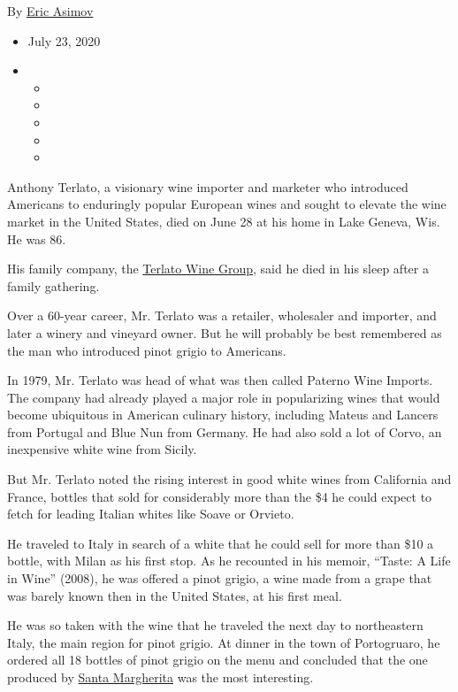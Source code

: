 By \href{https://www.nytimes3xbfgragh.onion/by/eric-asimov}{Eric Asimov}

\begin{itemize}
\item
  July 23, 2020
\item
  \begin{itemize}
  \item
  \item
  \item
  \item
  \item
  \end{itemize}
\end{itemize}

Anthony Terlato, a visionary wine importer and marketer who introduced
Americans to enduringly popular European wines and sought to elevate the
wine market in the United States, died on June 28 at his home in Lake
Geneva, Wis. He was 86.

His family company, the \href{http://www.twg.com/}{Terlato Wine Group},
said he died in his sleep after a family gathering.

Over a 60-year career, Mr. Terlato was a retailer, wholesaler and
importer, and later a winery and vineyard owner. But he will probably be
best remembered as the man who introduced pinot grigio to Americans.

In 1979, Mr. Terlato was head of what was then called Paterno Wine
Imports. The company had already played a major role in popularizing
wines that would become ubiquitous in American culinary history,
including Mateus and Lancers from Portugal and Blue Nun from Germany. He
had also sold a lot of Corvo, an inexpensive white wine from Sicily.

But Mr. Terlato noted the rising interest in good white wines from
California and France, bottles that sold for considerably more than the
\$4 he could expect to fetch for leading Italian whites like Soave or
Orvieto.

He traveled to Italy in search of a white that he could sell for more
than \$10 a bottle, with Milan as his first stop. As he recounted in his
memoir, ``Taste: A Life in Wine'' (2008), he was offered a pinot grigio,
a wine made from a grape that was barely known then in the United
States, at his first meal.

He was so taken with the wine that he traveled the next day to
northeastern Italy, the main region for pinot grigio. At dinner in the
town of Portogruaro, he ordered all 18 bottles of pinot grigio on the
menu and concluded that the one produced by
\href{https://santamargheritawines.com/our-wines/pinot-grigio/}{Santa
Margherita} was the most interesting.

